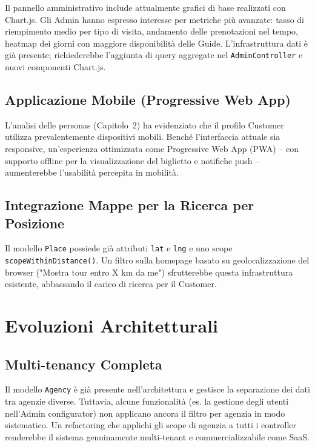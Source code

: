 Il pannello amministrativo include attualmente grafici di base realizzati con Chart.js. Gli Admin hanno espresso interesse per metriche più avanzate: tasso di riempimento medio per tipo di visita, andamento delle prenotazioni nel tempo, heatmap dei giorni con maggiore disponibilità delle Guide. L'infrastruttura dati è già presente; richiederebbe l'aggiunta di query aggregate nel \texttt{AdminController} e nuovi componenti Chart.js.

\subsection{Applicazione Mobile (Progressive Web App)}

L'analisi delle personas (Capitolo~2) ha evidenziato che il profilo Customer utilizza prevalentemente dispositivi mobili. Benché l'interfaccia attuale sia responsive, un'esperienza ottimizzata come Progressive Web App (PWA) -- con supporto offline per la visualizzazione del biglietto e notifiche push -- aumenterebbe l'usabilità percepita in mobilità.

\subsection{Integrazione Mappe per la Ricerca per Posizione}

Il modello \texttt{Place} possiede già attributi \texttt{lat} e \texttt{lng} e uno scope \texttt{scopeWithinDistance()}. Un filtro sulla homepage basato su geolocalizzazione del browser ("Mostra tour entro X km da me") sfrutterebbe questa infrastruttura esistente, abbassando il carico di ricerca per il Customer.

\section{Evoluzioni Architetturali}

\subsection{Multi-tenancy Completa}

Il modello \texttt{Agency} è già presente nell'architettura e gestisce la separazione dei dati tra agenzie diverse. Tuttavia, alcune funzionalità (es. la gestione degli utenti nell'Admin configurator) non applicano ancora il filtro per agenzia in modo sistematico. Un refactoring che applichi gli scope di agenzia a tutti i controller renderebbe il sistema genuinamente multi-tenant e commercializzabile come SaaS.

